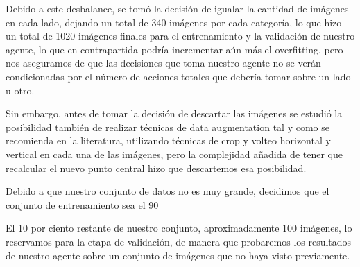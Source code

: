 Debido a este desbalance, se tomó la decisión de igualar la cantidad de imágenes en cada lado, dejando un total de 340 imágenes por cada categoría, lo que hizo un total de 1020 imágenes finales para el entrenamiento y la validación de nuestro agente, lo que en contrapartida podría incrementar aún más el overfitting, pero nos aseguramos de que las decisiones que toma nuestro agente no se verán condicionadas por el número de acciones totales que debería tomar sobre un lado u otro. 
\medskip

Sin embargo, antes de tomar la decisión de descartar las imágenes se estudió la posibilidad también de realizar técnicas de data augmentation tal y como se recomienda en la literatura, utilizando técnicas de crop y volteo horizontal y vertical en cada una de las imágenes, pero la complejidad añadida de tener que recalcular el nuevo punto central hizo que descartemos esa posibilidad.
\medskip

Debido a que nuestro conjunto de datos no es muy grande, decidimos que el conjunto de entrenamiento sea el 90%
\medskip

El 10 por ciento restante de nuestro conjunto, aproximadamente 100 imágenes, lo reservamos para la etapa de validación, de manera que probaremos los resultados de nuestro agente sobre un conjunto de imágenes que no haya visto previamente.

